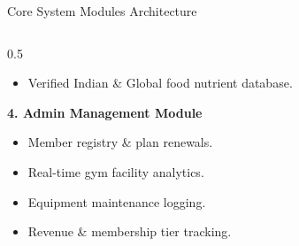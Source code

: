 \documentclass[aspectratio=169,10pt]{beamer}
\begin{document}
\begin{frame}{Core System Modules Architecture}
\begin{columns}[T]
\begin{column}{0.5\textwidth}
\begin{itemize}
        \item Verified Indian \& Global food nutrient database.
      \end{itemize}
      \vspace{0.2cm}
      \textbf{4. Admin Management Module}
      \begin{itemize}
        \item Member registry \& plan renewals.
        \item Real-time gym facility analytics.
        \item Equipment maintenance logging.
        \item Revenue \& membership tier tracking.
      \end{itemize}
    \end{column}
  \end{columns}
\end{frame}
\end{document}
